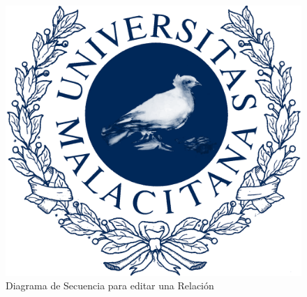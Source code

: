 \newpage %

\begin{figure}[H]
    \includegraphics[width=1\linewidth]{assets/umaLogo.png}
    \caption{Diagrama de Secuencia para editar una Relación}
   \end{figure}
\vspace{1.0cm}

\newpage %